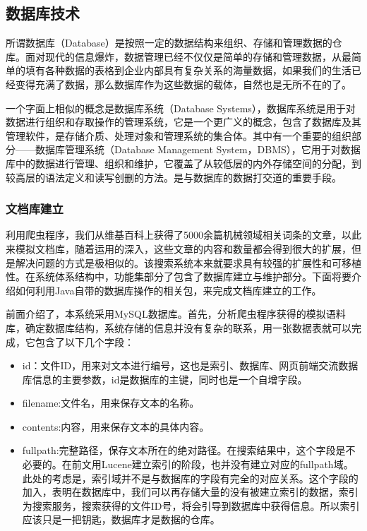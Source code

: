 \documentclass[12pt,a4paper]{article}
\begin{document}
	\subsection{数据库技术}
	所谓数据库（Database）是按照一定的数据结构来组织、存储和管理数据的仓库。面对现代的信息爆炸，数据管理已经不仅仅是简单的存储和管理数据，从最简单的填有各种数据的表格到企业内部具有复杂关系的海量数据，如果我们的生活已经变得充满了数据，那么数据库作为这些数据的载体，自然也是无所不在的了。
	
	一个字面上相似的概念是数据库系统（Database Systems），数据库系统是用于对数据进行组织和存取操作的管理系统，它是一个更广义的概念，包含了数据库及其管理软件，是存储介质、处理对象和管理系统的集合体。其中有一个重要的组织部分——数据库管理系统（Database Management System，DBMS），它用于对数据库中的数据进行管理、组织和维护，它覆盖了从较低层的内外存储空间的分配，到较高层的语法定义和读写创删的方法。是与数据库的数据打交道的重要手段。
	
			
		\subsubsection{文档库建立}
	利用爬虫程序，我们从维基百科上获得了5000余篇机械领域相关词条的文章，以此来模拟文档库，随着运用的深入，这些文章的内容和数量都会得到很大的扩展，但是解决问题的方式是极相似的。该搜索系统本来就要求具有较强的扩展性和可移植性。在系统体系结构中，功能集部分了包含了数据库建立与维护部分。下面将要介绍如何利用Java自带的数据库操作的相关包，来完成文档库建立的工作。
	
	前面介绍了，本系统采用MySQL数据库。首先，分析爬虫程序获得的模拟语料库，确定数据库结构，系统存储的信息并没有复杂的联系，用一张数据表就可以完成，它包含了以下几个字段：
	\begin{itemize}
		\item
	id：文件ID，用来对文本进行编号，这也是索引、数据库、网页前端交流数据库信息的主要参数，id是数据库的主键，同时也是一个自增字段。
		\item
	filename:文件名，用来保存文本的名称。
		\item
	contents:内容，用来保存文本的具体内容。
		\item
	fullpath:完整路径，保存文本所在的绝对路径。在搜索结果中，这个字段是不必要的。在前文用Lucene建立索引的阶段，也并没有建立对应的fullpath域。此处的考虑是，索引域并不是与数据库的字段有完全的对应关系。这个字段的加入，表明在数据库中，我们可以再存储大量的没有被建立索引的数据，索引为搜索服务，搜索获得的文件ID号，将会引导到数据库中获得信息。所以索引应该只是一把钥匙，数据库才是数据的仓库。
	\end{itemize}
	
\end{document}
